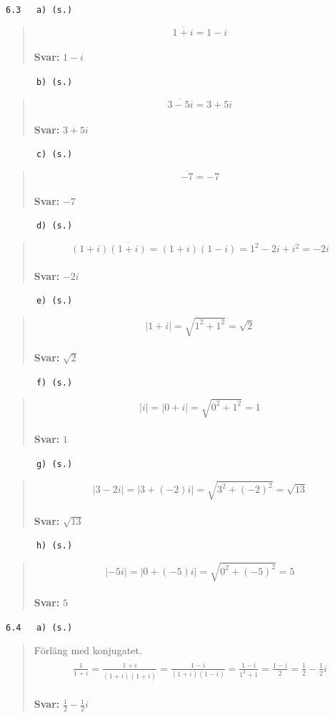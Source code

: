 \documentclass[a4paper]{article}
\newcommand{\tskcol}[1]{\textcolor{tskcol}{#1}}
\begin{document}
	\texttt{\tskcol{6.3~~~a) (s.)}}
	\begin{quotation}
		\noindent
		\[\overline{1+i}=
		1-i\]
		\\
		\textbf{Svar:} $1-i$
	\end{quotation}
	
	\texttt{\tskcol{~~~~~~b) (s.)}}
	\begin{quotation}
		\noindent
		\[\overline{3-5i}=
		3+5i\]
		\\
		\textbf{Svar:} $3+5i$
	\end{quotation}
	
	\texttt{\tskcol{~~~~~~c) (s.)}}
	\begin{quotation}
		\noindent
		\[\overline{-7}=
		-7\]
		\\
		\textbf{Svar:} $-7$
	\end{quotation}
	
	\texttt{\tskcol{~~~~~~d) (s.)}}
	\begin{quotation}
		\noindent
		\[(1+i)\overline{(1+i)}=
		(1+i)(1-i)=
		1^2-2i+i^2=
		-2i\]
		\\
		\textbf{Svar:} $-2i$
	\end{quotation}
	
	\texttt{\tskcol{~~~~~~e) (s.)}}
	\begin{quotation}
		\noindent
		\[|1+i|=
		\sqrt{1^2+1^2}=
		\sqrt{2}\]
		\\
		\textbf{Svar:} $\sqrt{2}$
	\end{quotation}
	
	\texttt{\tskcol{~~~~~~f) (s.)}}
	\begin{quotation}
		\noindent
		\[|i|=
		|0+i|=
		\sqrt{0^2+1^2}=
		1\]
		\\
		\textbf{Svar:} $1$
	\end{quotation}
	
	\texttt{\tskcol{~~~~~~g) (s.)}}
	\begin{quotation}
		\noindent
		\[|3-2i|=
		|3+(-2)i|=
		\sqrt{3^2+(-2)^2}=
		\sqrt{13}\]
		\\
		\textbf{Svar:} $\sqrt{13}$
	\end{quotation}
	
	\texttt{\tskcol{~~~~~~h) (s.)}}
	\begin{quotation}
		\noindent
		\[|-5i|=
		|0+(-5)i|=
		\sqrt{0^2+(-5)^2}=
		5\]
		\\
		\textbf{Svar:} $5$
	\end{quotation}
	
	\texttt{\tskcol{6.4~~~a) (s.)}}
	\begin{quotation}
		\noindent
		Förläng med konjugatet.
		\begin{align*}
		\frac{1}{1+i}=
		\frac{\overline{1+i}}{(1+i)\overline{(1+i)}}=
		\frac{1-i}{(1+i)(1-i)}=
		\frac{1-i}{1^2+1}=
		\frac{1-i}{2}=
		\frac{1}{2}-\frac{1}{2}i
		\end{align*}
		\\
		\textbf{Svar:} $\frac{1}{2}-\frac{1}{2}i$
	\end{quotation}
	
\end{document}
